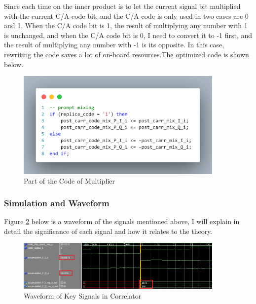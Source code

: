 Since each time on the inner product is to let the current signal bit multiplied with the current C/A code bit, and the C/A code is only used in two cases are 0 and 1. When the C/A code bit is 1, the result of multiplying any number with 1 is unchanged, and when the C/A code bit is 0, I need to convert it to -1 first, and the result of multiplying any number with -1 is its opposite. In this case, rewriting the code saves a lot of on-board resources.The optimized code is shown below.
\begin{figure}[!htbp]
    \centering
    \includegraphics[width=0.9\textwidth]{_IMAGES/multiplier_code.png}
    \caption{Part of the Code of Multiplier}
    \label{fig:multiplier_code}
\end{figure}

\subsubsection{Simulation and Waveform}
Figure \ref{fig:correlator_wave} below is a waveform  of the signals mentioned above, I will explain in detail the significance of each signal and how it relates to the theory.
\begin{figure}[!htbp]
    \centering
    \includegraphics[width=0.9\textwidth]{_IMAGES/correlator_wave.png}
    \caption{Waveform of Key Signals in Correlator}
    \label{fig:correlator_wave}
\end{figure}

